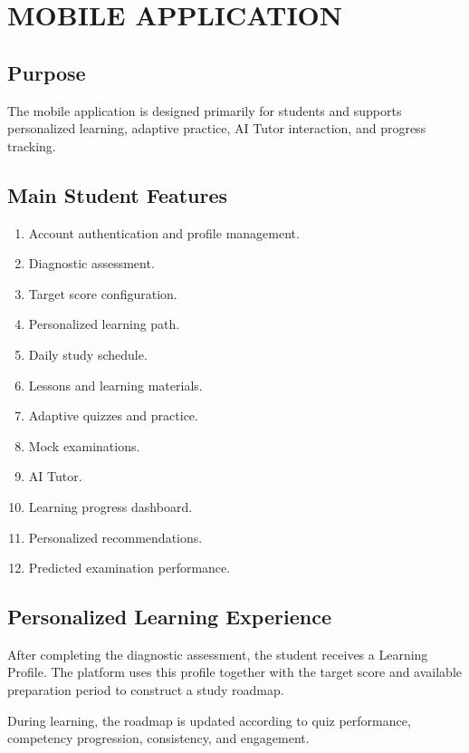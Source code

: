 \chapter{MOBILE APPLICATION}

\section{Purpose}

The mobile application is designed primarily for students and supports personalized learning, adaptive practice, AI Tutor interaction, and progress tracking.

\section{Main Student Features}

\begin{enumerate}
    \item Account authentication and profile management.
    \item Diagnostic assessment.
    \item Target score configuration.
    \item Personalized learning path.
    \item Daily study schedule.
    \item Lessons and learning materials.
    \item Adaptive quizzes and practice.
    \item Mock examinations.
    \item AI Tutor.
    \item Learning progress dashboard.
    \item Personalized recommendations.
    \item Predicted examination performance.
\end{enumerate}

\section{Personalized Learning Experience}

After completing the diagnostic assessment, the student receives a Learning Profile. The platform uses this profile together with the target score and available preparation period to construct a study roadmap.

During learning, the roadmap is updated according to quiz performance, competency progression, consistency, and engagement.

